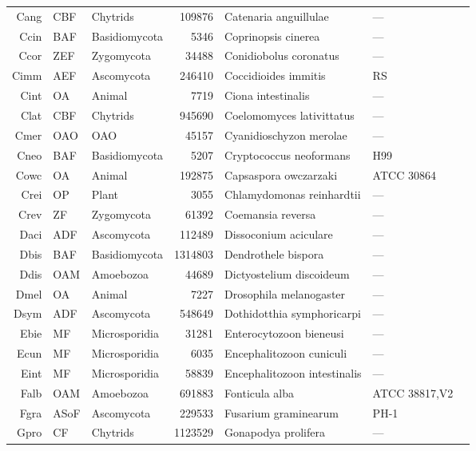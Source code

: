 {{{\begin{longtable}{rllrlll}
  Cang & CBF & Chytrids & 109876 & Catenaria anguillulae & --- & \cite{Cang} \\ 
  Ccin & BAF & Basidiomycota & 5346 & Coprinopsis cinerea & --- & \cite{Ccin} \\ 
  Ccor & ZEF & Zygomycota & 34488 & Conidiobolus coronatus & --- & \cite{Ccor} \\ 
  Cimm & AEF & Ascomycota & 246410 & Coccidioides immitis & RS & \cite{Cimm} \\ 
  Cint & OA & Animal & 7719 & Ciona intestinalis & --- & \cite{Cint} \\ 
  Clat & CBF & Chytrids & 945690 & Coelomomyces lativittatus & --- & \cite{Clat} \\ 
  Cmer & OAO & OAO & 45157 & Cyanidioschyzon merolae & --- & \cite{Cmer} \\ 
  Cneo & BAF & Basidiomycota & 5207 & Cryptococcus neoformans & H99 & \cite{Cneo} \\ 
  Cowc & OA & Animal & 192875 & Capsaspora owczarzaki & ATCC 30864 & \cite{Cowc} \\ 
  Crei & OP & Plant & 3055 & Chlamydomonas reinhardtii & --- & \cite{Crei} \\ 
  Crev & ZF & Zygomycota & 61392 & Coemansia reversa & --- & \cite{Crev} \\ 
  Daci & ADF & Ascomycota & 112489 & Dissoconium aciculare & --- & \cite{Daci} \\ 
  Dbis & BAF & Basidiomycota & 1314803 & Dendrothele bispora & --- & \cite{Dbis} \\ 
  Ddis & OAM & Amoebozoa & 44689 & Dictyostelium discoideum & --- & \cite{Ddis} \\ 
  Dmel & OA & Animal & 7227 & Drosophila melanogaster & --- & \cite{Dmel} \\ 
  Dsym & ADF & Ascomycota & 548649 & Dothidotthia symphoricarpi & --- & \cite{Dsym} \\ 
  Ebie & MF & Microsporidia & 31281 & Enterocytozoon bieneusi & --- & \cite{Ebie} \\ 
  Ecun & MF & Microsporidia & 6035 & Encephalitozoon cuniculi & --- & \cite{Ecun} \\ 
  Eint & MF & Microsporidia & 58839 & Encephalitozoon intestinalis & --- & \cite{Eint} \\ 
  Falb & OAM & Amoebozoa & 691883 & Fonticula alba & ATCC 38817,V2 & \cite{Falb} \\ 
  Fgra & ASoF & Ascomycota & 229533 & Fusarium graminearum  & PH-1 & \cite{Fgra} \\ 
  Gpro & CF & Chytrids & 1123529 & Gonapodya prolifera & --- & \cite{Gpro} \\ 

\end{longtable}}}}
